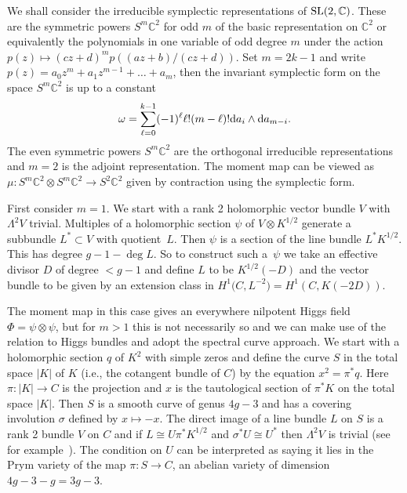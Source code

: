 \documentclass[pdftex]{sigma}
\newcommand{\C}{\mathbb{C}}
\begin{document}
We shall consider the irreducible symplectic representations of ${\rm SL}(2,\C)$. These are the symmetric powers $S^m\C^2$ for odd $m$ of the basic representation on $\C^2$ or equivalently the polynomials in one variable of odd degree $m$ under the action
$p(z)\mapsto (cz+d)^mp((az+b)/(cz+d)).$
 Set $m=2k-1$ and write $p(z)=a_0z^m+a_1z^{m-1}+\dots+a_m$, then the invariant symplectic form on the space $S^m\C^2$ is up to a constant
\begin{equation}
\omega=\sum_{\ell=0}^{k-1}(-1)^{\ell}\ell!(m-\ell)!{\rm d}a_i\wedge {\rm d}a_{m-i}.\label{symp}
\end{equation}
The even symmetric powers $S^{m}\C^2$ are the orthogonal irreducible representations and $m=2$ is the adjoint representation. The moment map can be viewed as $\mu\colon S^m\C^2\otimes S^m\C^2\rightarrow S^2\C^2$ given by contraction using the symplectic form.

 First consider $m=1$.
We start with a rank 2 holomorphic vector bundle $V$ with $\Lambda^2V$ trivial. Multiples of a holomorphic section $\psi$ of $V\otimes K^{1/2}$ generate a subbundle $L^*\subset V$ with quotient~$L$. Then $\psi$ is a section of the line bundle $L^*K^{1/2}$. This has degree $g-1-\deg L$. So to construct such a~$\psi$ we take an effective divisor $D$ of degree $< g-1$ and define $L$ to be $K^{1/2}(-D)$ and the vector bundle to be given by an extension class in $H^1\big(C,L^{-2}\big)=H^1(C,K(-2D))$.

The moment map in this case gives an everywhere nilpotent Higgs field $\Phi=\psi\otimes \psi$, but for $m>1$ this is not necessarily so and we can make use of the relation to Higgs bundles and adopt the spectral curve approach.
We start with a holomorphic section $q$ of $K^2$ with simple zeros and define the curve $S$ in the total space $\vert K\vert$ of $K$ (i.e., the cotangent bundle of $C$) by the equation $x^2=\pi^*q$. Here $\pi\colon \vert K\vert \rightarrow C$ is the projection and $x$ is the tautological section of $\pi^*K$ on the total space $\vert K\vert $. Then $S$ is a smooth curve of genus $4g-3$ and has a covering involution $\sigma$ defined by $x\mapsto-x$. The direct image of a line bundle $L$ on $S$ is a rank 2 bundle $V$ on $C$ and if $L\cong U\pi^*K^{1/2}$ and $\sigma^*U\cong U^*$ then $\Lambda^2V$ is trivial (see for example~\cite{BeauvilleA/NarasimhanM/RamananS}). The condition on $U$ can be interpreted as saying it lies in the Prym variety of the map $\pi\colon S\rightarrow C$, an abelian variety of dimension $4g-3-g=3g-3$.
\end{document}
